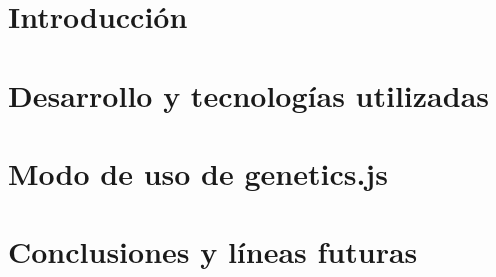 \documentclass[spanish,a4paper,12pt,oneside]{extreport}
\begin{document}
\newpage{\pagestyle{empty}}

\listoffigures

\newpage{\pagestyle{empty}}

\listoftables

\newpage{\pagestyle{empty}}

\renewcommand{\thepage}{\arabic{page}}
\setcounter{page}{1}


\chapter{Introducción}
\label{chapter:intro}




\chapter{Desarrollo y tecnologías utilizadas}
\label{chapter:desarrollo}



\newpage{\pagestyle{empty}}
\thispagestyle{empty}

\chapter{Modo de uso de genetics.js}
\label{chapter:casodeuso}



\newpage{\pagestyle{empty}}
\thispagestyle{empty}

\chapter{Conclusiones y líneas futuras}
\label{chapter:conclusiones}



\newpage{\pagestyle{empty}}
\thispagestyle{empty}
\end{document}

